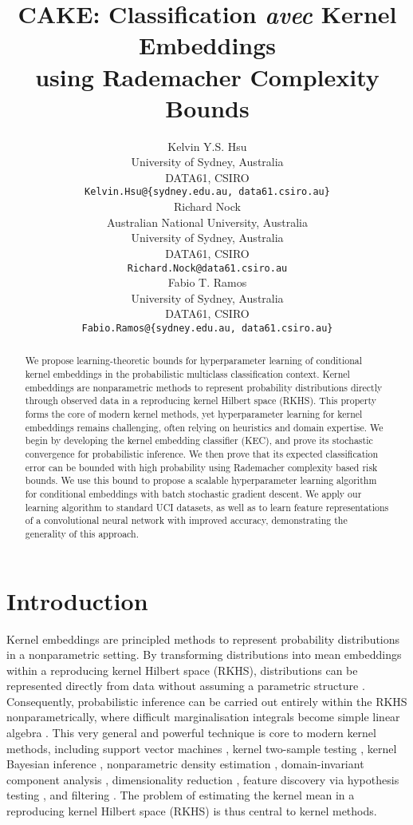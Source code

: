 \documentclass{article}
\title{CAKE: Classification \textit{avec} Kernel Embeddings \\ using Rademacher Complexity Bounds}
\author{
	Kelvin Y.S. Hsu \\
	University of Sydney, Australia\\
	DATA61, CSIRO\\
	\texttt{Kelvin.Hsu@\{sydney.edu.au, data61.csiro.au\}} \\
	\And
	Richard Nock \\
	Australian National University, Australia\\
	University of Sydney, Australia\\
	DATA61, CSIRO\\
	\texttt{Richard.Nock@data61.csiro.au} \\
	\And
	Fabio T. Ramos \\
	University of Sydney, Australia\\
	DATA61, CSIRO\\
	\texttt{Fabio.Ramos@\{sydney.edu.au, data61.csiro.au\}} \\
}
\begin{document}

\maketitle

\begin{abstract}
	We propose learning-theoretic bounds for hyperparameter learning of conditional kernel embeddings in the probabilistic multiclass classification context. Kernel embeddings are nonparametric methods to represent probability distributions directly through observed data in a reproducing kernel Hilbert space (RKHS). This property forms the core of modern kernel methods, yet hyperparameter learning for kernel embeddings remains challenging, often relying on heuristics and domain expertise. We begin by developing the kernel embedding classifier (KEC), and prove its stochastic convergence for probabilistic inference. We then prove that its expected classification error can be bounded with high probability using Rademacher complexity based risk bounds. We use this bound to propose a scalable hyperparameter learning algorithm for conditional embeddings with batch stochastic gradient descent. We apply our learning algorithm to standard UCI datasets, as well as to learn feature representations of a convolutional neural network with improved accuracy, demonstrating the generality of this approach.
\end{abstract}

\section{Introduction}
\label{sec:introduction}
	
	Kernel embeddings are principled methods to represent probability distributions in a nonparametric setting. By transforming distributions into mean embeddings within a reproducing kernel Hilbert space (RKHS), distributions can be represented directly from data without assuming a parametric structure \citep{song2013kernel}. Consequently, probabilistic inference can be carried out entirely within the RKHS nonparametrically, where difficult marginalisation integrals become simple linear algebra \citep{muandet2016kernel}. This very general and powerful technique is core to modern kernel methods, including support vector machines \citep{scholkopf2002learning}, kernel two-sample testing \citep{gretton2007kernel}, kernel Bayesian inference  \citep{fukumizu2013kernel}, nonparametric density estimation \citep{song2008tailoring, kanagawa2014recovering}, domain-invariant component analysis \citep{muandet2013domain}, dimensionality reduction \citep{fukumizu2004dimensionality}, feature discovery via hypothesis testing \citep{jitkrittum2016interpretable}, and filtering \citep{kanagawa2016filtering}. The problem of estimating the kernel mean in a reproducing kernel Hilbert space (RKHS) is thus central to kernel methods.
	
\end{document}
